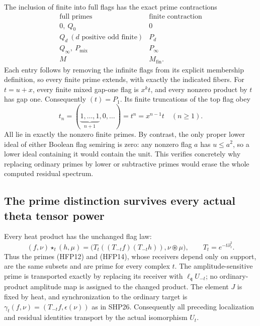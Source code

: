 The inclusion of finite into full flags has the exact
prime contractions
\begin{equation}\tag{HFP28}
\begin{array}{c|c}
 \text{full primes}&\text{finite contraction}\\\hline
 0,\ Q_0&0\\
 Q_d\ (d\text{ positive odd finite})&P_d\\
 Q_\infty,\ P_{\mathrm{mix}}&P_\infty\\
 M&M_{\mathrm{fin}}.
\end{array}
\end{equation}
Each entry follows by removing the infinite flags from
its explicit membership definition, so every finite
prime extends, with exactly the indicated fibers.
For $t=u+x$, every finite mixed gap-one flag is $x^kt$,
and every nonzero product by $t$ has gap one. Consequently
$(t)=P_1$. Its finite truncations of the top flag obey
\begin{equation}\tag{HFP29}
 t_n=(\underbrace{1,\ldots,1}_{n+1},0,\ldots)
       =t^n=x^{n-1}t\quad(n\ge1).
\end{equation}
All lie in exactly the nonzero finite primes. By contrast,
the only proper lower ideal of either Boolean flag
semiring is zero: any nonzero flag $a$ has $u\le a^2$,
so a lower ideal containing it would contain the unit.
This verifies concretely why replacing ordinary primes
by lower or subtractive primes would erase the whole
computed residual spectrum.

\subsection{The prime distinction survives every actual theta tensor power}

Every heat product has the unchanged flag law:
\begin{equation}\tag{HFP30}
 (f,\nu)\star_t(h,\mu)
   =\bigl(T_t((T_{-t}f)(T_{-t}h)),\nu\circledast\mu\bigr),
 \qquad T_t=e^{-t\partial_z^2}.
\end{equation}
Thus the primes (HFP12) and (HFP14), whose receivers
depend only on support, are the same subsets and are
prime for every complex $t$. The amplitude-sensitive
prime is transported exactly by replacing its receiver
with $\ell_{\mathfrak q}U_{-t}$; no ordinary-product
amplitude map is assigned to the changed product.
The element $J$ is fixed by heat, and synchronization
to the ordinary target is
$\gamma_t(f,\nu)=(T_{-t}f,\epsilon(\nu))$ as in SHP26.
Consequently all preceding localization and residual
identities transport by the actual isomorphism $U_t$.

